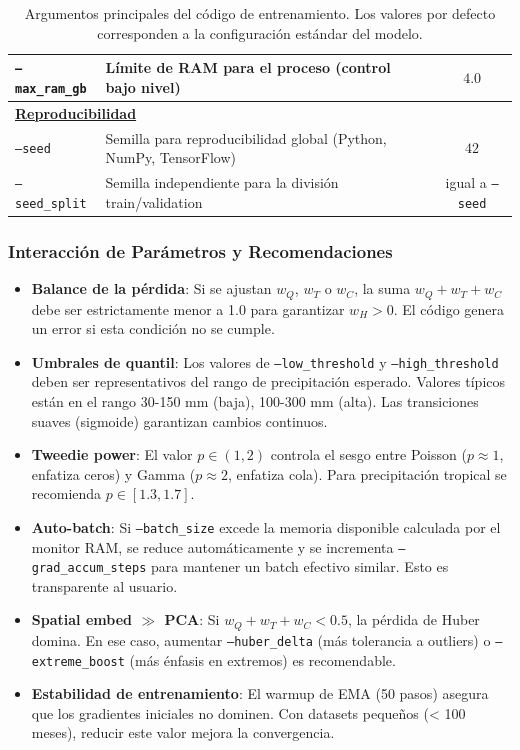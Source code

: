 \begin{table}[h!]
\begin{tabularx}{\textwidth}{|l|p{8cm}|c|}
\texttt{--max\_ram\_gb} & Límite de RAM para el proceso (control bajo nivel) & $4.0$ \\
\hline
\multicolumn{3}{|l|}{\textbf{\underline{Reproducibilidad}}} \\
\hline
\texttt{--seed} & Semilla para reproducibilidad global (Python, NumPy, TensorFlow) & $42$ \\
\texttt{--seed\_split} & Semilla independiente para la división train/validation & igual a \texttt{--seed} \\
\hline
\end{tabularx}
\caption{Argumentos principales del código de entrenamiento. Los valores por defecto corresponden a la configuración estándar del modelo.}
\label{tab:training_args}
\end{table}

\subsubsection{Interacción de Parámetros y Recomendaciones}

\begin{itemize}
    
    \item \textbf{Balance de la pérdida}: Si se ajustan $w_Q$, $w_T$ o $w_C$, la suma $w_Q + w_T + w_C$ debe ser estrictamente menor a 1.0 para garantizar $w_H > 0$. El código genera un error si esta condición no se cumple.
    
    \item \textbf{Umbrales de quantil}: Los valores de \texttt{--low\_threshold} y \texttt{--high\_threshold} deben ser representativos del rango de precipitación esperado. Valores típicos están en el rango 30-150 mm (baja), 100-300 mm (alta). Las transiciones suaves (sigmoide) garantizan cambios continuos.
    
    \item \textbf{Tweedie power}: El valor $p \in (1, 2)$ controla el sesgo entre Poisson ($p \approx 1$, enfatiza ceros) y Gamma ($p \approx 2$, enfatiza cola). Para precipitación tropical se recomienda $p \in [1.3, 1.7]$.
    
    \item \textbf{Auto-batch}: Si \texttt{--batch\_size} excede la memoria disponible calculada por el monitor RAM, se reduce automáticamente y se incrementa \texttt{--grad\_accum\_steps} para mantener un batch efectivo similar. Esto es transparente al usuario.
    
    \item \textbf{Spatial embed $\gg$ PCA}: Si $w_Q + w_T + w_C < 0.5$, la pérdida de Huber domina. En ese caso, aumentar \texttt{--huber\_delta} (más tolerancia a outliers) o \texttt{--extreme\_boost} (más énfasis en extremos) es recomendable.
    
    \item \textbf{Estabilidad de entrenamiento}: El warmup de EMA (50 pasos) asegura que los gradientes iniciales no dominen. Con datasets pequeños (< 100 meses), reducir este valor mejora la convergencia.
    
\end{itemize}

